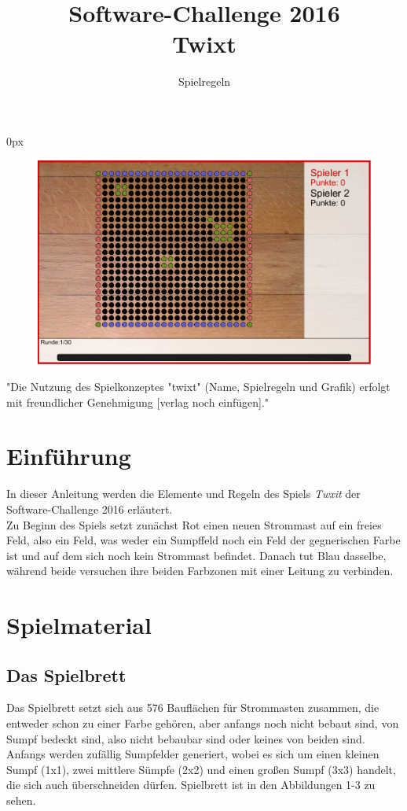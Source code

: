 \documentclass[a4paper, ngerman]{scrartcl}
\title{Software-Challenge 2016 \\ Twixt}
\subtitle{Spielregeln}
\begin{document}
 
\parindent0px
\maketitle

\begin{figure}[h!]
	\centering
	\includegraphics[width=\linewidth]{bilder/gui.png} 
\end{figure}
\vspace*{\fill}
"Die Nutzung des Spielkonzeptes "twixt" (Name, Spielregeln
und Grafik) erfolgt mit freundlicher Genehmigung [verlag noch einfügen]."
\newpage
\tableofcontents
\newpage

\section{Einführung}
In dieser Anleitung werden die Elemente und Regeln des Spiels \emph{Twxit} der
Software-Challenge 2016 erläutert.\\
Zu Beginn des Spiels setzt zunächst Rot einen neuen Strommast auf ein freies
Feld, also ein Feld, was weder ein Sumpffeld noch ein Feld der gegnerischen
Farbe ist und auf dem sich noch kein Strommast befindet. Danach tut Blau
dasselbe, während beide versuchen ihre beiden Farbzonen mit einer Leitung zu
verbinden.

\section{Spielmaterial}
	\subsection{Das Spielbrett}
Das Spielbrett setzt sich aus 576 Bauflächen für Strommasten zusammen,
die entweder schon zu einer Farbe gehören, aber anfangs noch nicht bebaut sind,
von Sumpf bedeckt sind, also nicht bebaubar sind oder keines von beiden sind.
Anfangs werden zufällig Sumpfelder generiert, wobei es sich um einen kleinen
Sumpf (1x1), zwei mittlere Sümpfe (2x2) und einen großen Sumpf (3x3) handelt,
die sich auch überschneiden dürfen. Spielbrett ist in den Abbildungen 1-3 zu
sehen.
\end{document}
